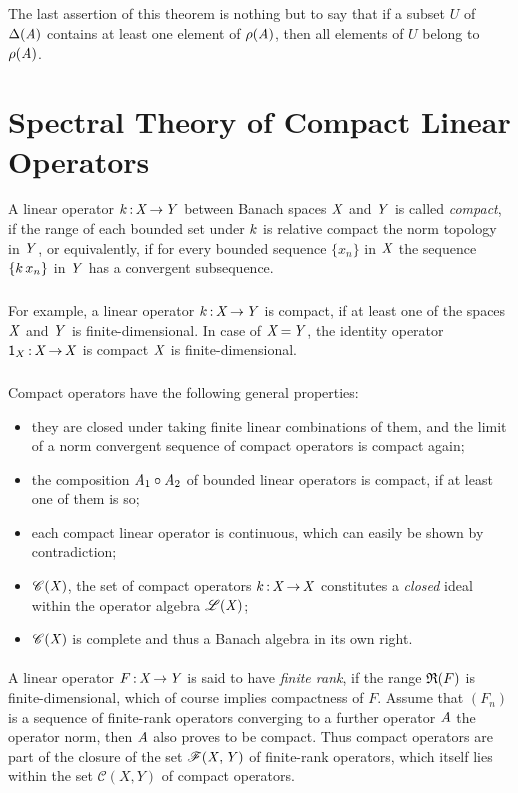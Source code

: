 \documentclass[11pt,twoside]{article}
\begin{document}
\subparagraph*{}
The last assertion of this theorem is nothing but to say
that if a subset $U$ of $\Delta(\mathit{A})$ contains at least one element
of $\rho(\mathit{A})$,
then all elements of $U$ belong to $\rho(\mathit{A})$.

\section{Spectral Theory of Compact Linear Operators}
A linear operator $k {\,:\,} \mathit{X} {\,\to\,} \mathit{Y}$ between Banach spaces
$\mathit{X}$ and $\mathit{Y}$ is called \textit{compact},
if the range of each bounded set under $k$ is relative compact
{\wrt} the norm topology in $\mathit{Y}$,
or equivalently,
if for every bounded sequence $\{x_n\}$ in $\mathit{X}$
the sequence $\{k \, x_n\}$ in $\mathit{Y}$ has a convergent subsequence.

\subparagraph*{}
For example,
a linear operator $k {\,:\,} \mathit{X} {\,\to\,} \mathit{Y}$ is compact,
if at least one of the spaces $\mathit{X}$ and $\mathit{Y}$ is finite-dimensional.
In case of $\mathit{X} {\,=\,} \mathit{Y}$,
the identity operator ${\mathsf{1}}_X {\,:\,} \mathit{X} {\,\to\,} \mathit{X}$ is compact
\iff $\mathit{X}$ is finite-dimensional.

\subsubsection*{} %
Compact operators have the following general properties:

\begin{itemize}[leftmargin=12pt]
\item[1.]
they are closed under taking finite linear combinations of them,
and the limit of a norm convergent sequence of compact operators
is compact again;
\item[2.]
the composition $\mathit{A}_1 \circ \mathit{A}_2$ of bounded linear operators
is compact,
if at least one of them is so;
\item[3.]
each compact linear operator is continuous, 
which can easily be shown by contradiction;
\item[4.]
$\mathscr{C}(\mathit{X})$, the set of compact operators $k {\,:\,} \mathit{X} {\,\to\,} \mathit{X}$
constitutes a \textit{closed} ideal within the operator algebra $\mathscr{L}(\mathit{X}) $;
\item[5.]
$\mathscr{C}(\mathit{X})$ is complete and thus a Banach algebra in its own right.
\end{itemize}

\paragraph*{}
A linear operator $F {\,:\,} \mathit{X} {\,\to\,} \mathit{Y}$ is said to have \textit{finite rank},
if the range $\mathfrak{R}(F)$ is finite-dimensional,
which of course implies compactness of $F$.
Assume that $(F_n)$ is a sequence of finite-rank operators
converging to a further operator $\mathit{A}$ {\wrt} the operator norm,
then $\mathit{A}$ also proves to be compact.
Thus compact operators are part of
the closure of the set $\mathscr{F}(\mathit{X},\mathit{Y})$ of finite-rank operators,
which itself lies within the set $\mathscr{C}(X,Y)$ of compact operators.
\end{document}
